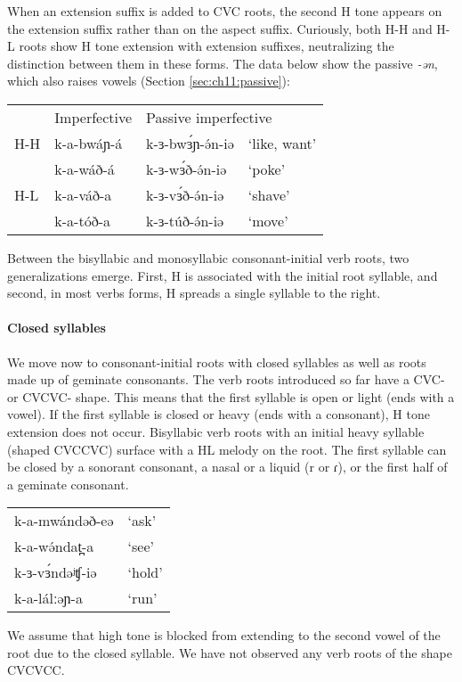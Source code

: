 When an extension suffix is added to CVC roots, the second H tone appears on the extension suffix rather than on the aspect suffix. Curiously, both H-H and H-L roots show H tone extension with extension suffixes, neutralizing the distinction between them in these forms. The data below show the passive \textit{-ən}, which also raises vowels (Section \ref{sec:ch11:passive}): 
\ea 
\begin{tabular}[t]{llll}
&	Imperfective	&	\multicolumn{2}{l}{Passive imperfective} 	\\
H-H &	k-a-bwáɲ-á	&	k-ɜ-bwɜ́ɲ-ə́n-iə	&	‘like, want’\\
	&	k-a-wáð-á	&	k-ɜ-wɜ́ð-ə́n-iə	&	‘poke’\\
H-L &	k-a-váð-a	&	k-ɜ-vɜ́ð-ə́n-iə	&	‘shave’\\
	&	k-a-tóð-a	&	k-ɜ-túð-ə́n-iə	&	‘move’\\
\end{tabular}	
\z 

Between the bisyllabic and monosyllabic consonant-initial verb roots, two generalizations emerge. First, H is associated with the initial root syllable, and second, in most verbs forms, H spreads a single syllable to the right. 
			
\paragraph{Closed syllables} We move now to consonant-initial roots with closed syllables as well as roots made up of geminate consonants. The verb roots introduced so far have a CVC- or CVCVC- shape. This means that the first syllable is open or light (ends with a vowel). If the first syllable is closed or heavy (ends with a consonant), H tone extension does not occur. Bisyllabic verb roots with an initial heavy syllable (shaped CVCCVC) surface with a HL melody on the root. The first syllable can be closed by a sonorant consonant, a nasal or a liquid (r or ɾ), or the first half of a geminate consonant. 
\ea 	
\begin{tabular}[t]{ll}
k-a-mwándəð-eə	&	‘ask’\\
k-a-wə́ndat̪-a		&	‘see’\\
k-ɜ-vɜ́ndəʲʧ-iə	&	‘hold’\\
k-a-lálːəɲ-a	&	‘run’ \\	
\end{tabular}
\z 
We assume that high tone is blocked from extending to the second vowel of the root due to the closed syllable. We have not observed any verb roots of the shape CVCVCC. 

